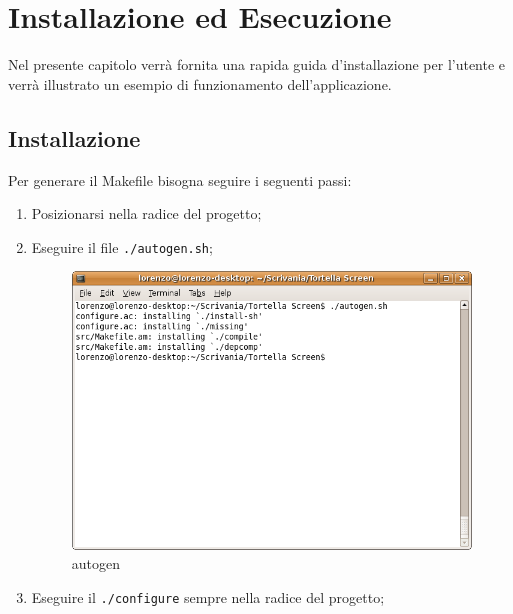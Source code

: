 \chapter{Installazione ed Esecuzione}
\lstset{basicstyle=\normalsize}
Nel presente capitolo verrà fornita una rapida guida d'installazione per l'utente e verrà illustrato un esempio di funzionamento dell'applicazione.
\section{Installazione}
Per generare il Makefile bisogna seguire i seguenti passi: 
\begin{enumerate}
\item Posizionarsi nella radice del progetto; 
\item Eseguire il file \lstinline{./autogen.sh};
\begin{figure}[H]
\begin{center}
\includegraphics[scale=0.5]{etc/autogen.png}
\caption{autogen}
\label{autogen}
\end{center}
\end{figure}
\item Eseguire il \lstinline{./configure} sempre nella radice del progetto;
\begin{figure}[H]
\begin{center}

\end{center}
\end{figure}
\end{enumerate}
